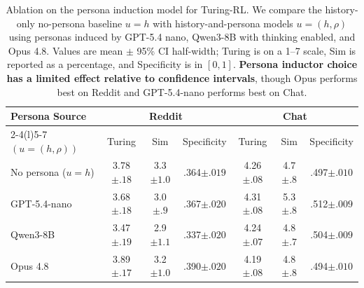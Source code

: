 \documentclass{article} %
\newcommand{\subtle}[1]{{\tiny\color[gray]{0.4}#1}}
\begin{document}
\begin{table}[t]
\centering
\small
\setlength{\tabcolsep}{2.0pt}
\begin{tabular*}{\columnwidth}{@{\extracolsep{\fill}}lcccccc@{}}
\toprule
Persona Source & \multicolumn{3}{c}{Reddit} & \multicolumn{3}{c}{Chat} \\
\cmidrule(lr){2-4}\cmidrule(l){5-7}
$(u=(h,\rho))$ & Turing & Sim & Specificity & Turing & Sim & Specificity \\
\midrule
No persona ($u=h$) & 3.78\subtle{$\pm .18$} & 3.3\subtle{$\pm 1.0$} & .364\subtle{$\pm .019$} & 4.26\subtle{$\pm .08$} & 4.7\subtle{$\pm .8$} & .497\subtle{$\pm .010$} \\
GPT-5.4-nano & 3.68\subtle{$\pm .18$} & 3.0\subtle{$\pm .9$} & .367\subtle{$\pm .020$} & 4.31\subtle{$\pm .08$} & 5.3\subtle{$\pm .8$} & .512\subtle{$\pm .009$} \\
Qwen3-8B & 3.47\subtle{$\pm .19$} & 2.9\subtle{$\pm 1.1$} & .337\subtle{$\pm .020$} & 4.24\subtle{$\pm .07$} & 4.8\subtle{$\pm .7$} & .504\subtle{$\pm .009$} \\
Opus 4.8 & 3.89\subtle{$\pm .17$} & 3.2\subtle{$\pm 1.0$} & .390\subtle{$\pm .020$} & 4.19\subtle{$\pm .08$} & 4.8\subtle{$\pm .8$} & .494\subtle{$\pm .010$} \\
\bottomrule
\end{tabular*}
\caption{Ablation on the persona induction model for Turing-RL. We compare the history-only no-persona baseline $u=h$ with history-and-persona models $u=(h,\rho)$ using personas induced by GPT-5.4 nano, Qwen3-8B with thinking enabled, and Opus 4.8. Values are mean $\pm$ 95\% CI half-width; Turing is on a 1--7 scale, Sim is reported as a percentage, and Specificity is in $[0,1]$. \textbf{Persona inductor choice has a limited effect relative to confidence intervals}, though Opus performs best on Reddit and GPT-5.4-nano performs best on Chat.}
\label{tab:persona_inductor_ablation}
\vspace{-0.3cm}
\end{table}


\end{document}

